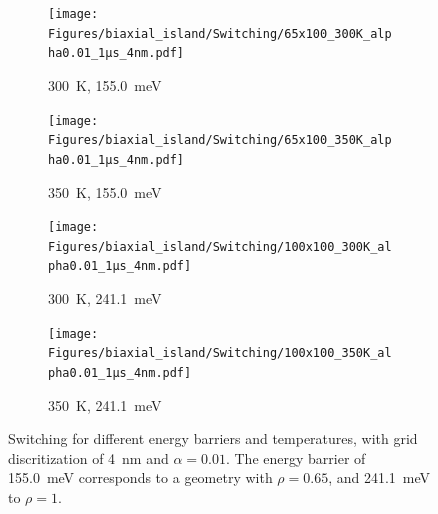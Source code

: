 \documentclass[12pt,a4paper]{article}
\begin{document}
\begin{figure}
     \centering
     \begin{subfigure}[b]{0.49\textwidth}
         \centering
         \texttt{[image: Figures/biaxial\_island/Switching/65x100\_300K\_alpha0.01\_1µs\_4nm.pdf]}
         \caption{\SI{300}{\kelvin}, \SI{155.0}{\milli\electronvolt}}
         \label{fig:switching-temp-300-65x100}
     \end{subfigure}
     \hfill
     \begin{subfigure}[b]{0.49\textwidth}
         \centering
         \texttt{[image: Figures/biaxial\_island/Switching/65x100\_350K\_alpha0.01\_1µs\_4nm.pdf]}
         \caption{\SI{350}{\kelvin}, \SI{155.0}{\milli\electronvolt}}
         \label{fig:switching-temp-350-65x100}
     \end{subfigure}
     \begin{subfigure}[b]{0.49\textwidth}
         \centering
         \texttt{[image: Figures/biaxial\_island/Switching/100x100\_300K\_alpha0.01\_1µs\_4nm.pdf]}
         \caption{\SI{300}{\kelvin}, \SI{241.1}{\milli\electronvolt}}
         \label{fig:switching-temp-300-100x100}
     \end{subfigure}
     \hfill
     \begin{subfigure}[b]{0.49\textwidth}
         \centering
         \texttt{[image: Figures/biaxial\_island/Switching/100x100\_350K\_alpha0.01\_1µs\_4nm.pdf]}
         \caption{\SI{350}{\kelvin}, \SI{241.1}{\milli\electronvolt}}
         \label{fig:switching-temp-350-100x100}
     \end{subfigure}
    \caption{Switching for different energy barriers and temperatures, with grid discritization of \SI{4}{\nano\metre} and $\alpha = 0.01$. The energy barrier of \SI{155.0}{\milli\electronvolt} corresponds to a geometry with $\rho=0.65$, and \SI{241.1}{\milli\electronvolt} to $\rho=1$.}
    \label{fig:switching-temp}
\end{figure}
\end{document}
